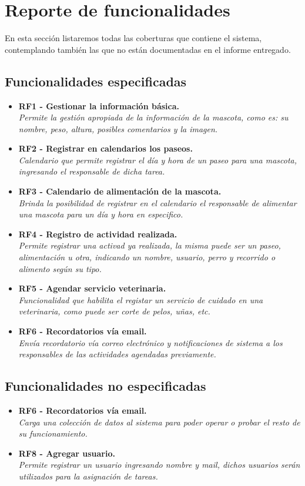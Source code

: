 \section{Reporte de funcionalidades}

En esta sección listaremos todas las coberturas que contiene el sistema, contemplando también las que no están documentadas en el informe entregado.

\subsection{Funcionalidades especificadas}
\begin{itemize}
    \item \textbf{RF1 - Gestionar la información básica.} \\
    \textit{Permite la gestión apropiada de la información de la mascota, como es:
    su nombre, peso, altura, posibles comentarios y la imagen.}
    \item \textbf{RF2 - Registrar en calendarios los paseos.} \\
    \textit{Calendario que permite registrar el día y hora de un paseo para una mascota, ingresando el responsable de dicha tarea.}
    \item \textbf{RF3 - Calendario de alimentación de la mascota.} \\
    \textit{Brinda la posibilidad de registrar en el calendario el responsable de alimentar una mascota para un día y hora en especifico.}
    \item \textbf{RF4 - Registro de actividad realizada.} \\
    \textit{Permite registrar una activad ya realizada, la misma puede ser un paseo, alimentación u otra, indicando un nombre, usuario, perro y recorrido o alimento según su tipo.}
    \item \textbf{RF5 - Agendar servicio veterinaria.} \\
    \textit{Funcionalidad que habilita el registar un servicio de cuidado en una veterinaria, como puede ser corte de pelos, uñas, etc.}
    \item \textbf{RF6 - Recordatorios vía email.} \\
    \textit{Envía recordatorio vía correo electrónico y notificaciones de sistema a los responsables de las actividades agendadas previamente.}
\end{itemize}

\subsection{Funcionalidades no especificadas}
\begin{itemize}
    \item \textbf{RF6 - Recordatorios vía email.} \\
    \textit{Carga una colección de datos al sistema para poder operar o probar el resto de su funcionamiento.}
    \item \textbf{RF8 - Agregar usuario.} \\
    \textit{Permite registrar un usuario ingresando nombre y mail, dichos usuarios serán utilizados para la asignación de tareas.}
\end{itemize}


